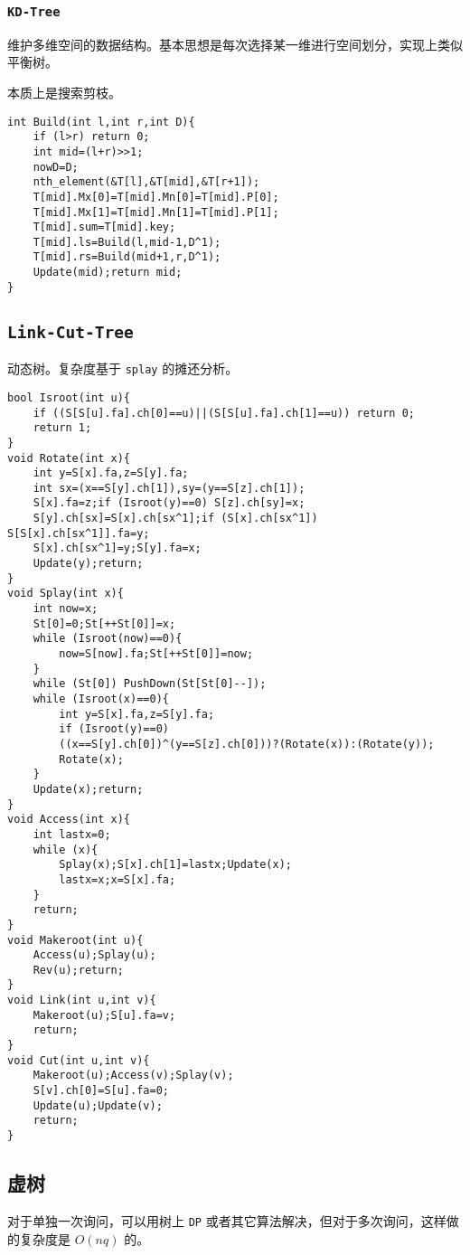 \documentclass[UTF-8]{ctexart}
\begin{document}
	\subsubsection{\texttt{KD-Tree}}
	维护多维空间的数据结构。基本思想是每次选择某一维进行空间划分，实现上类似平衡树。
	
	本质上是搜索剪枝。
	\begin{verbatim}
int Build(int l,int r,int D){
    if (l>r) return 0;
    int mid=(l+r)>>1;
    nowD=D;
    nth_element(&T[l],&T[mid],&T[r+1]);
    T[mid].Mx[0]=T[mid].Mn[0]=T[mid].P[0];
    T[mid].Mx[1]=T[mid].Mn[1]=T[mid].P[1];
    T[mid].sum=T[mid].key;
    T[mid].ls=Build(l,mid-1,D^1);
    T[mid].rs=Build(mid+1,r,D^1);
    Update(mid);return mid;
}
	\end{verbatim}
	\subsection{\texttt{Link-Cut-Tree}}
	动态树。复杂度基于 \texttt{splay} 的摊还分析。
\begin{verbatim}
bool Isroot(int u){
    if ((S[S[u].fa].ch[0]==u)||(S[S[u].fa].ch[1]==u)) return 0;
    return 1;
}
void Rotate(int x){
    int y=S[x].fa,z=S[y].fa;
    int sx=(x==S[y].ch[1]),sy=(y==S[z].ch[1]);
    S[x].fa=z;if (Isroot(y)==0) S[z].ch[sy]=x;
    S[y].ch[sx]=S[x].ch[sx^1];if (S[x].ch[sx^1]) S[S[x].ch[sx^1]].fa=y;
    S[x].ch[sx^1]=y;S[y].fa=x;
    Update(y);return;
}
void Splay(int x){
    int now=x;
    St[0]=0;St[++St[0]]=x;
    while (Isroot(now)==0){
        now=S[now].fa;St[++St[0]]=now;
    }
    while (St[0]) PushDown(St[St[0]--]);
    while (Isroot(x)==0){
        int y=S[x].fa,z=S[y].fa;
        if (Isroot(y)==0)
        ((x==S[y].ch[0])^(y==S[z].ch[0]))?(Rotate(x)):(Rotate(y));
        Rotate(x);
    }
    Update(x);return;
}
void Access(int x){
    int lastx=0;
    while (x){
        Splay(x);S[x].ch[1]=lastx;Update(x);
        lastx=x;x=S[x].fa;
    }
    return;
}
void Makeroot(int u){
    Access(u);Splay(u);
    Rev(u);return;
}
void Link(int u,int v){
    Makeroot(u);S[u].fa=v;
    return;
}
void Cut(int u,int v){
    Makeroot(u);Access(v);Splay(v);
    S[v].ch[0]=S[u].fa=0;
    Update(u);Update(v);
    return;
}
\end{verbatim}
	\subsection{虚树}
	对于单独一次询问，可以用树上 \texttt{DP} 或者其它算法解决，但对于多次询问，这样做的复杂度是 $O(nq)$ 的。
	
\end{document}
